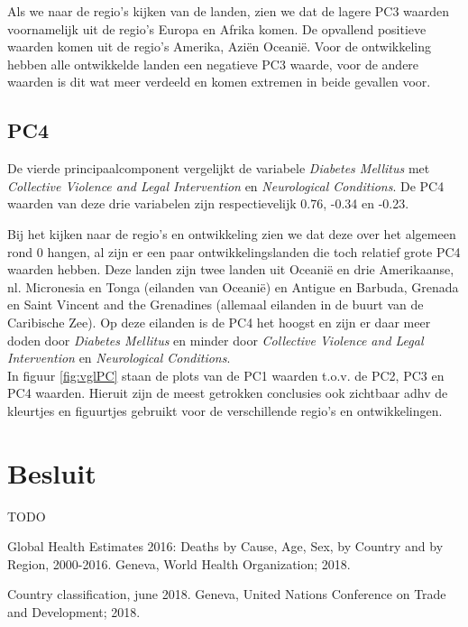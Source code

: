 \documentclass[a4paper,kulak]{kulakarticle}
\begin{document}
Als we naar de regio's kijken van de landen, zien we dat de lagere PC3 waarden voornamelijk uit de regio's Europa en Afrika komen. De opvallend positieve waarden komen uit de regio's Amerika, Azi\" en Oceani\"e. Voor de ontwikkeling hebben alle ontwikkelde landen een negatieve PC3 waarde, voor de andere waarden is dit wat meer verdeeld en komen extremen in beide gevallen voor. 

\subsection{PC4}
De vierde principaalcomponent vergelijkt de variabele \textit{Diabetes Mellitus} met \textit{Collective Violence and Legal Intervention} en \textit{Neurological Conditions}. De PC4 waarden van deze drie variabelen zijn respectievelijk 0.76, -0.34 en -0.23. 

Bij het kijken naar de regio's en ontwikkeling zien we dat deze over het algemeen rond 0 hangen, al zijn er een paar ontwikkelingslanden die toch relatief grote PC4 waarden hebben. Deze landen zijn twee landen uit Oceani\"e en drie Amerikaanse, nl.  Micronesia en Tonga (eilanden van Oceani\"e) en Antigue en Barbuda, Grenada en Saint Vincent and the Grenadines (allemaal eilanden in de buurt van de Caribische Zee). Op deze eilanden is de PC4 het hoogst en zijn er daar meer doden door \textit{Diabetes Mellitus} en minder door \textit{Collective Violence and Legal Intervention} en \textit{Neurological Conditions}.\\

In figuur \ref{fig:vglPC} staan de plots van de PC1 waarden t.o.v. de PC2, PC3 en PC4 waarden. Hieruit zijn de meest getrokken conclusies ook zichtbaar adhv de kleurtjes en figuurtjes gebruikt voor de verschillende regio's en ontwikkelingen. 

\section*{Besluit}

TODO


\begin{thebibliography}{9}
	
	Global Health Estimates 2016: Deaths by Cause, Age, Sex, by Country and by Region, 2000-2016.
	Geneva, World Health Organization; 2018.
	
	Country classification, june 2018. Geneva, United Nations Conference on Trade and Development;
	2018.
	
\end{thebibliography}
\end{document}
